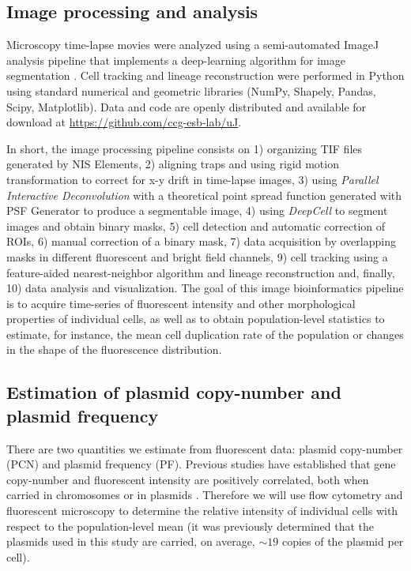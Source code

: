 \documentclass[fleqn,12pt]{wlscirep}
\begin{document}
\subsection{Image processing and analysis}

Microscopy time-lapse movies were analyzed using a semi-automated ImageJ \cite{schneider2012nih} analysis pipeline that implements a deep-learning algorithm for image segmentation \cite{vanValen2016}.  Cell tracking and lineage reconstruction were performed in Python using standard numerical and geometric libraries (NumPy, Shapely, Pandas, Scipy, Matplotlib).  Data and code are openly distributed and available for download at \href{https://github.com/ccg-esb-lab/uJ}{https://github.com/ccg-esb-lab/uJ}.

 In short, the image processing pipeline consists on 1) organizing TIF files generated by NIS Elements, 2) aligning traps and using rigid motion transformation to correct for x-y drift in time-lapse images, 3) using {\em Parallel Interactive Deconvolution} with a theoretical point spread function generated with PSF Generator to produce a segmentable image, 4) using {\em DeepCell}\cite{vanValen2016} to segment images and obtain binary masks, 5) cell detection and automatic correction of ROIs, 6) manual correction of a binary mask, 7) data acquisition by overlapping masks in different fluorescent and bright field channels, 9) cell tracking using a feature-aided nearest-neighbor algorithm and lineage reconstruction and, finally, 10) data analysis and visualization.
The goal of this image bioinformatics pipeline is to acquire time-series of fluorescent intensity and other morphological properties of individual cells, as well as to obtain population-level statistics to estimate, for instance, the mean cell duplication rate of the population or changes in the shape of the fluorescence distribution.

\subsection{Estimation of plasmid copy-number and plasmid frequency}

There are two quantities we estimate from fluorescent data: plasmid copy-number (PCN) and plasmid frequency (PF). 
Previous studies have established that gene copy-number and fluorescent intensity are positively correlated, both when carried in chromosomes\cite{bergmiller2017biased} or in plasmids \cite{ghozzi2010inference,Rodriguez2018}.  Therefore we will use flow cytometry and fluorescent microscopy to determine the relative intensity of individual cells with respect to the population-level mean (it was previously determined that the plasmids used in this study are carried, on average, $\sim 19$ copies of the plasmid per cell)\cite{san2016multicopy}. 
\end{document}
